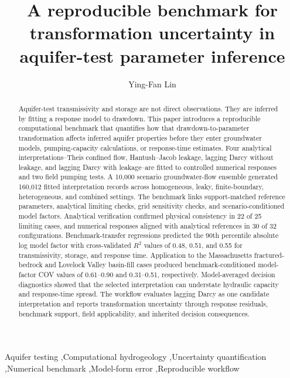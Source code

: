 \documentclass[a4paper,fleqn]{cas-sc}
\begin{document}
\let\WriteBookmarks\relax
\def\floatpagepagefraction{1}
\def\textpagefraction{.001}

\title [mode = title]{A reproducible benchmark for transformation uncertainty in aquifer-test parameter inference}

\author[1]{Ying-Fan Lin}

\address[1]{Department of Civil Engineering, Chung Yuan Christian University, Taoyuan, Taiwan}

\begin{abstract}
Aquifer-test transmissivity and storage are not direct observations. They are inferred by fitting a response model to drawdown. This paper introduces a reproducible computational benchmark that quantifies how that drawdown-to-parameter transformation affects inferred aquifer properties before they enter groundwater models, pumping-capacity calculations, or response-time estimates. Four analytical interpretations--Theis confined flow, Hantush--Jacob leakage, lagging Darcy without leakage, and lagging Darcy with leakage--are fitted to controlled numerical responses and two field pumping tests. A 10,000 scenario groundwater-flow ensemble generated 160,012 fitted interpretation records across homogeneous, leaky, finite-boundary, heterogeneous, and combined settings. The benchmark links support-matched reference parameters, analytical limiting checks, grid sensitivity checks, and scenario-conditioned model factors. Analytical verification confirmed physical consistency in 22 of 25 limiting cases, and numerical responses aligned with analytical references in 30 of 32 configurations. Benchmark-transfer regressions predicted the 90th percentile absolute log model factor with cross-validated $R^2$ values of 0.48, 0.51, and 0.55 for transmissivity, storage, and response time. Application to the Massachusetts fractured-bedrock and Lovelock Valley basin-fill cases produced benchmark-conditioned model-factor COV values of 0.61--0.90 and 0.31--0.51, respectively. Model-averaged decision diagnostics showed that the selected interpretation can understate hydraulic capacity and response-time spread. The workflow evaluates lagging Darcy as one candidate interpretation and reports transformation uncertainty through response residuals, benchmark support, field applicability, and inherited decision consequences.
\end{abstract}

\begin{keywords}
Aquifer testing \sep Computational hydrogeology \sep Uncertainty quantification \sep Numerical benchmark \sep Model-form error \sep Reproducible workflow
\end{keywords}
\end{document}
